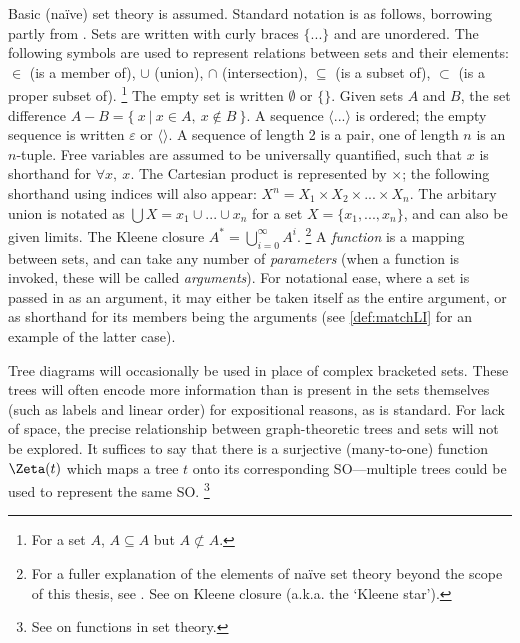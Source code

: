 Basic (naïve) set theory is assumed. Standard notation is as follows, borrowing partly from \CS[43]. Sets are written with curly braces $\{...\}$ and are unordered. The following symbols are used to represent relations between sets and their elements: $\in$ (is a member of), $\cup$ (union), $\cap$ (intersection), $\subseteq$ (is a subset of), $\subset$ (is a proper subset of).%
\footnote{For a set $A$, $A\subseteq A$ but $A\nsubset A$.}
The empty set is written $\emptyset$ or $\{\}$. Given sets $A$ and $B$, the set difference $A-B=\{\ x\ |\ x\in A,\ x\notin B\ \}$. A sequence $\langle ... \rangle$ is ordered; the empty sequence is written $\varepsilon$ or $\langle\rangle$. A sequence of length 2 is a pair, one of length $n$ is an $n$-tuple. Free variables are assumed to be universally quantified, such that $x$ is shorthand for $\forall x,\ x$. The Cartesian product is represented by $\times$; the following shorthand using indices will also appear: $X^n = X_1 \times X_2 \times ... \times X_n$. The arbitary union is notated as $\bigcup X = x_1 \cup ... \cup x_n$ for a set $X=\{x_1,...,x_n\}$, and can also be given limits. The Kleene closure $A^* = \bigcup_{i=0}^{\infty} A^i$.%
\footnote{For a fuller explanation of the elements of naïve set theory beyond the scope of this thesis, see \textcite{KaplanskyI_1972,EndertonHB_1977}. See \textcite[87]{HopcroftJE.etal_2013} on Kleene closure (a.k.a. the `Kleene star').}
A \textit{function} is a mapping between sets, and can take any number of \textit{parameters} (when a function is invoked, these will be called \textit{arguments}). For notational ease, where a set is passed in as an argument, it may either be taken itself as the entire argument, or as shorthand for its members being the arguments (see \autoref{def:matchLI} for an example of the latter case).

Tree diagrams will occasionally be used in place of complex bracketed sets. These trees will often encode more information than is present in the sets themselves (such as labels and linear order) for expositional reasons, as is standard. For lack of space, the precise relationship between graph-theoretic trees and sets will not be explored. It suffices to say that there is a surjective (many-to-one) function $\Zeta(t)$ which maps a tree $t$ onto its corresponding SO---multiple trees could be used to represent the same SO.%
\footnote{See \textcite[Chapter 15]{AvigadJ.etal_2017} on functions in set theory.}


















